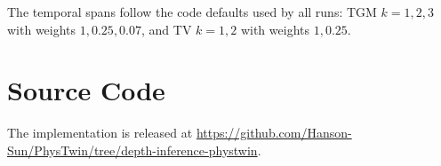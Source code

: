 The temporal spans follow the code defaults used by all runs: TGM $k = 1, 2, 3$ with weights
$1, 0.25, 0.07$, and TV $k = 1, 2$ with weights $1, 0.25$.



\chapter{Source Code}
\label{app:code}

The implementation is released at
\url{https://github.com/Hanson-Sun/PhysTwin/tree/depth-inference-phystwin}.

